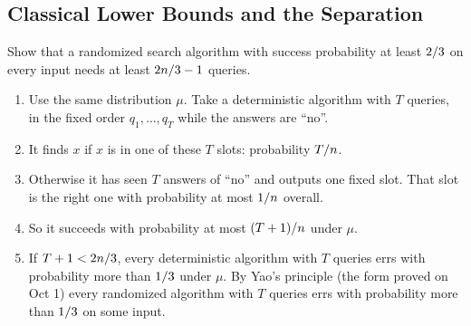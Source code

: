 \subsection{Classical Lower Bounds and the Separation}

\begin{exercisebox}
\begin{pproblem}\label{pp:yao-mc}
    Show that a randomized search algorithm with success probability at least $2/3$ on
    every input needs at least $2n/3 - 1$ queries.
\end{pproblem}
\tcblower
\begin{wsolution}
    \leavevmode
    \begin{enumerate}
        \item Use the same distribution $\mu$. Take a deterministic algorithm with $T$ queries, in
              the fixed order $q_1, \dots, q_T$ while the answers are ``no''.
        \item It finds $x$ if $x$ is in one of these $T$ slots: probability $T/n$.
        \item Otherwise it has seen $T$ answers of ``no'' and outputs one fixed slot. That slot is
              the right one with probability at most $1/n$ overall.
        \item So it succeeds with probability at most $(T+1)/n$ under $\mu$.
        \item If $T + 1 < 2n/3$, every deterministic algorithm with $T$ queries errs with
              probability more than $1/3$ under $\mu$. By Yao's principle (the form proved
              on Oct 1) every randomized algorithm with $T$ queries errs with probability more than
              $1/3$ on some input. \qedhere
    \end{enumerate}
\end{wsolution}
\end{exercisebox}

